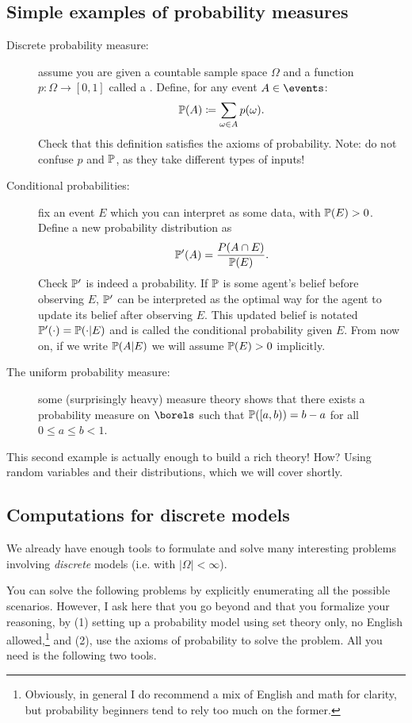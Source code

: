 \documentclass{article}
\begin{document}
\subsection{Simple examples of probability measures}

\begin{description}
  \item[Discrete probability measure:] assume you are given a countable sample space $\Omega$ and a function $p: \Omega \to [0, 1]$ called a \PMF. Define, for any event $A \in \events$: \[ \P(A) \defeq \sum_{\omega \in A} p(\omega). \] Check that this definition satisfies the axioms of probability. Note: do not confuse $p$ and $\P$, as they take different types of inputs!
  \item[Conditional probabilities:] fix an event $E$ which you can interpret as some data, with $\P(E) > 0$. Define a new probability distribution as \[ \P'(A) = \frac{P(A \cap E)}{\P(E)}. \] Check $\P'$ is indeed a probability. If $\P$ is some agent's belief before observing $E$, $\P'$ can be interpreted as the optimal way for the agent to update its belief after observing $E$. This updated belief is notated $\P'(\cdot) = \P(\cdot | E)$ and is called the conditional probability given $E$. From now on, if we write $\P(A | E)$ we will assume $\P(E) > 0$ implicitly.
  \item[The uniform probability measure:] some (surprisingly heavy) measure theory shows that there exists a probability measure on $\borels$ such that $\P([a, b)) = b - a$ for all $0 \le a \le b < 1$.
\end{description}

This second example is actually enough to build a rich theory! How? Using random variables and their distributions, which we will cover shortly.


\subsection{Computations for discrete models}\label{sec:computation-discrete}

We already have enough tools to formulate and solve many interesting problems involving \emph{discrete} models (i.e. with $|\Omega| < \infty$). 

 You can solve the following problems by explicitly enumerating all the possible scenarios. However, I ask here that you go beyond and that you formalize your reasoning, by (1) setting up a probability model using set theory only, no English allowed,\footnote{Obviously, in general I do recommend a mix of English and math for clarity, but probability beginners tend to rely too much on the former.} and (2), use the axioms of probability to solve the problem. All you need is the following two tools.
\end{document}
